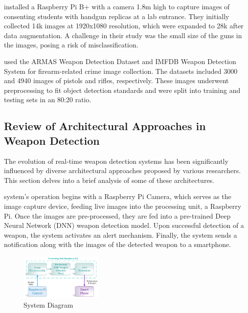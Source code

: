 \citet{rfc19} installed a Raspberry Pi B+ with a camera 1.8m high to capture images of consenting students with handgun replicas at a lab entrance. They initially collected 14k images at 1920x1080 resolution, which were expanded to 28k after data augmentation. A challenge in their study was the small size of the guns in the images, posing a risk of misclassification.

\citet{rfc20} used the ARMAS Weapon Detection Dataset and IMFDB Weapon Detection System \cite{rfc28} for firearm-related crime image collection. The datasets included 3000 and 4940 images of pistols and rifles, respectively. These images underwent preprocessing to fit object detection standards and were split into training and testing sets in an 80:20 ratio.

\subsection{Review of Architectural Approaches in Weapon Detection}
The evolution of real-time weapon detection systems has been significantly influenced by diverse architectural approaches proposed by various researchers. This section delves into a brief analysis of some of these architectures.

\citet{rfc44} system's operation begins with a Raspberry Pi Camera, which serves as the image capture device, feeding live images into the processing unit, a Raspberry Pi. Once the images are pre-processed, they are fed into a pre-trained Deep Neural Network (DNN) weapon detection model. Upon successful detection of a weapon, the system activates an alert mechanism. Finally, the system sends a notification along with the images of the detected weapon to a smartphone.

\begin{figure}[h]
    \centering 
    \includegraphics[width=0.36\textwidth]{figs/uob-architecture.png} 
    \caption{\citet{rfc44} System Diagram}
    \label{fig:uob-architecture}
\end{figure}

